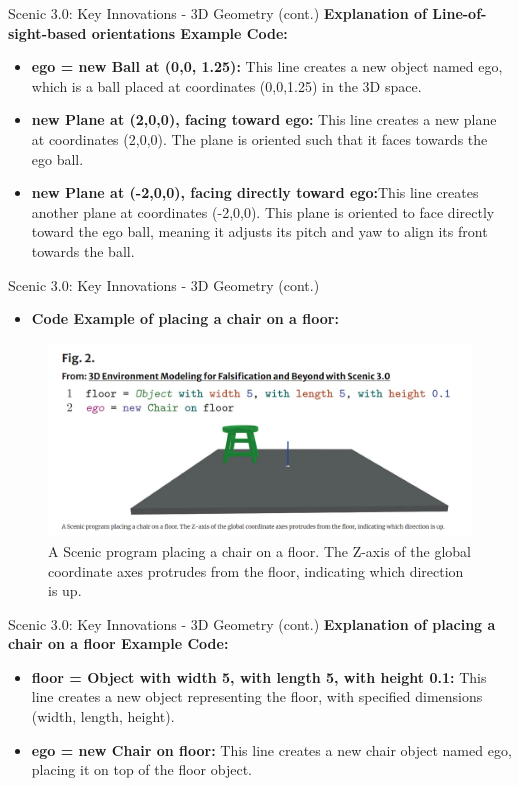 \documentclass[10pt]{beamer}
\begin{document}
\begin{frame}{Scenic 3.0: Key Innovations - 3D Geometry (cont.)}
    \textbf{Explanation of Line-of-sight-based orientations Example Code:}\\
    \begin{itemize}
        \item \textbf{ego = new Ball at (0,0, 1.25):} This line creates a new object named ego, which is a ball placed at coordinates (0,0,1.25) in the 3D space.
        \item \textbf{new Plane at (2,0,0), facing toward ego:} This line creates a new plane at coordinates (2,0,0). The plane is oriented such that it faces towards the ego ball.
        \item \textbf{new Plane at (-2,0,0), facing directly toward ego:}This line creates another plane at coordinates (-2,0,0). This plane is oriented to face directly toward the ego ball, meaning it adjusts its pitch and yaw to align its front towards the ball.
    \end{itemize}
\end{frame}

\begin{frame}{Scenic 3.0: Key Innovations - 3D Geometry (cont.)}
  \begin{itemize}
    \item \textbf{Code Example of placing a chair on a floor:}
  \end{itemize}
\begin{figure}
\centering
\includegraphics[width=0.7\linewidth]{FIG2.png}
\caption{A Scenic program placing a chair on a floor. The Z-axis of the global coordinate axes protrudes from the floor, indicating which direction is up.}
\label{fig:chair-on-floor}
\end{figure}
\end{frame}

\begin{frame}{Scenic 3.0: Key Innovations - 3D Geometry (cont.)}
    \textbf{Explanation of placing a chair on a floor Example Code:}\\
    \begin{itemize}
        \item \textbf{floor = Object with width 5, with length 5, with height 0.1:} This line creates a new object representing the floor, with specified dimensions (width, length, height).
        \item \textbf{ego = new Chair on floor: }This line creates a new chair object named ego, placing it on top of the floor object.
    \end{itemize}
\end{frame}
\end{document}
